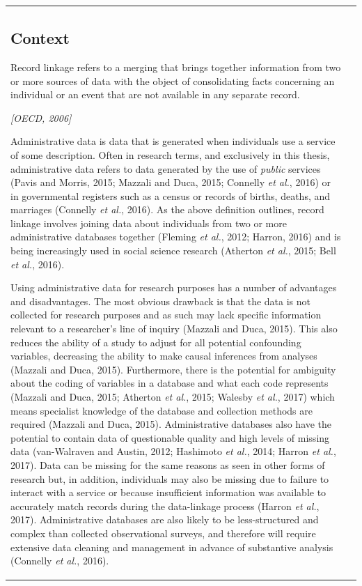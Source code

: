 \documentclass[12pt,a4paper,oneside,table]{report}
\begin{document}
\begin{tabular}[t]{ll}
\subsection{Context}

\epigraph{Record linkage refers to a merging that brings together information from two or more sources of data with the object of consolidating facts concerning an individual or an event that are not available in any separate record.}{\textit{[OECD, 2006]}}

Administrative data is data that is generated when individuals use a
service of some description. Often in research terms, and exclusively in
this thesis, administrative data refers to data generated by the use of
\textit{public} services (Pavis and Morris, 2015; Mazzali and Duca,
2015; Connelly \emph{et al.}, 2016) or in governmental registers such as
a census or records of births, deaths, and marriages (Connelly \emph{et
al.}, 2016). As the above definition outlines, record linkage involves
joining data about individuals from two or more administrative databases
together (Fleming \emph{et al.}, 2012; Harron, 2016) and is being
increasingly used in social science research (Atherton \emph{et al.},
2015; Bell \emph{et al.}, 2016).

Using administrative data for research purposes has a number of
advantages and disadvantages. The most obvious drawback is that the data
is not collected for research purposes and as such may lack specific
information relevant to a researcher's line of inquiry (Mazzali and
Duca, 2015). This also reduces the ability of a study to adjust for all
potential confounding variables, decreasing the ability to make causal
inferences from analyses (Mazzali and Duca, 2015). Furthermore, there is
the potential for ambiguity about the coding of variables in a database
and what each code represents (Mazzali and Duca, 2015; Atherton \emph{et
al.}, 2015; Walesby \emph{et al.}, 2017) which means specialist
knowledge of the database and collection methods are required (Mazzali
and Duca, 2015). Administrative databases also have the potential to
contain data of questionable quality and high levels of missing data
(van-Walraven and Austin, 2012; Hashimoto \emph{et al.}, 2014; Harron
\emph{et al.}, 2017). Data can be missing for the same reasons as seen
in other forms of research but, in addition, individuals may also be
missing due to failure to interact with a service or because
insufficient information was available to accurately match records
during the data-linkage process (Harron \emph{et al.}, 2017).
Administrative databases are also likely to be less-structured and
complex than collected observational surveys, and therefore will require
extensive data cleaning and management in advance of substantive
analysis (Connelly \emph{et al.}, 2016).


\end{tabular}
\end{document}
